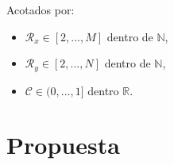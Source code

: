 
Acotados por:


\begin{itemize}
	\item $\mathscr{R}_x \in [2,...,M]$ dentro de $\mathbb{N}$,
	\item $\mathscr{R}_y \in [2,...,N]$ dentro de $\mathbb{N}$,
	\item $\mathscr{C} \in (0,...,1]$ dentro $\mathbb{R}$.
\end{itemize}


\section{Propuesta}\label{sec:proposal}

